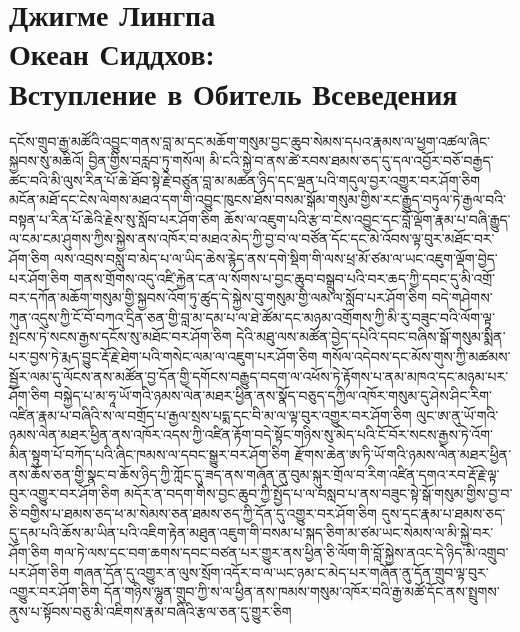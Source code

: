 \normalsize
\section{Джигме Лингпа \\Океан Сиддхов:\\Вступление в Обитель Всеведения}

\ti
དངོས་གྲུབ་རྒྱ་མཚོའི་འབྱུང་གནས་བླ་མ་དང་མཆོག་གསུམ་བྱང་ཆུབ་སེམས་དཔའ་རྣམས་ལ་ཕྱག་འཚལ་ཞིང་སྐྱབས་སུ་མཆིའོ།
བྱིན་གྱིས་བརླབ་ཏུ་གསོལ།
མི་ངའི་སྐྱེ་བ་ནས་ཚེ་རབས་ཐམས་ཅད་དུ་དལ་འབྱོར་བཅོ་བརྒྱད་ཚང་བའི་མི་ལུས་རིན་པོ་ཆེ་ཐོབ་སྟེ་རྗེ་བཙུན་བླ་མ་མཚན་ཉིད་དང་ལྡན་པའི་གདུལ་བྱར་འགྱུར་བར་ཤོག་ཅིག
མངོན་མཐོ་དང་ངེས་ལེགས་མཐའ་དག་གི་འབྱུང་ཁུངས་ཐོས་བསམ་སྒོམ་གསུམ་གྱིས་རང་རྒྱུད་བཏུལ་ཏེ་རྒྱལ་བའི་བསྟན་པ་རིན་པོ་ཆེའི་རྗེས་སུ་སློབ་པར་ཤོག་ཅིག
ཆོས་ལ་འཇུག་པའི་རྩ་བ་ངེས་འབྱུང་དང་བློ་ལྡོག་རྣམ་པ་བཞི་རྒྱུད་ལ་ངམ་ངམ་ཤུགས་ཀྱིས་སྐྱེས་ནས་འཁོར་བ་མཐའ་མེད་ཀྱི་བྱ་བ་ལ་བཙོན་དོང་དང་མེ་འོབས་ལྟ་བུར་མཐོང་བར་ཤོག་ཅིག
ལས་འབྲས་བསླུ་བ་མེད་པ་ལ་ཡིད་ཆེས་རྙེད་ནས་དགེ་སྡིག་གི་ལས་ཕྲ་མོ་ཙམ་ལ་ཡང་འཇུག་ལྡོག་བྱེད་པར་ཤོག་ཅིག
གནས་གྲོགས་འདུ་འཛི་རྐྱེན་ངན་ལ་སོགས་པ་བྱང་ཆུབ་བསྒྲུབ་པའི་བར་ཆད་ཀྱི་དབང་དུ་མི་འགྲོ་བར་དཀོན་མཆོག་གསུམ་གྱི་སྐྱབས་འོག་ཏུ་ཚུད་དེ་སྐྱེས་བུ་གསུམ་གྱི་ལམ་ལ་སློབ་པར་ཤོག་ཅིག
བདེ་གཤེགས་ཀུན་འདུས་ཀྱི་ངོ་བོ་བཀའ་དྲིན་ཅན་གྱི་བླ་མ་དམ་པ་ལ་ཐེ་ཚོམ་དང་མཉམ་འགྲོགས་ཀྱི་མི་རུ་བཟུང་བའི་ལོག་ལྟ་སྤངས་ཏེ་སངས་རྒྱས་དངོས་སུ་མཐོང་བར་ཤོག་ཅིག
དེའི་མཐུ་ལས་མཚོན་བྱེད་དཔེའི་དབང་བཞིས་སྒོ་གསུམ་སྨིན་པར་བྱས་ཏེ་རྨད་བྱུང་རྡོ་རྗེ་ཐེག་པའི་གསེང་ལམ་ལ་འཇུག་པར་ཤོག་ཅིག
གསོལ་འདེབས་དང་མོས་གུས་ཀྱི་མཚམས་སྦྱོར་ལམ་དུ་ལོངས་ནས་མཚོན་བྱ་དོན་གྱི་དགོངས་བརྒྱུད་བདག་ལ་འཕོས་ཏེ་རྟོགས་པ་ནམ་མཁའ་དང་མཉམ་པར་ཤོག་ཅིག
བསྐྱེད་པ་མ་ཧཱ་ཡོ་གའི་ཉམས་ལེན་མཐར་ཕྱིན་ནས་སྣོད་བཅུད་དཀྱིལ་འཁོར་གསུམ་དུ་ཤེས་ཤིང་རིག་འཛིན་རྣམ་པ་བཞིའི་ས་ལ་བགྲོད་པ་རྒྱལ་སྲས་པདྨ་དང་བི་མ་ལ་ལྟ་བུར་འགྱུར་བར་ཤོག་ཅིག
ལུང་ཨ་ནུ་ཡོ་གའི་ཉམས་ལེན་མཐར་ཕྱིན་ནས་འཁོར་འདས་ཀྱི་འཛིན་རྟོག་བདེ་སྟོང་གཉིས་སུ་མེད་པའི་ངོ་བོར་སངས་རྒྱས་ཏེ་འོག་མིན་སྟུག་པོ་བཀོད་པའི་ཞིང་ཁམས་ལ་དབང་སྒྱུར་བར་ཤོག་ཅིག
རྫོགས་ཆེན་ཨ་ཏི་ཡོ་གའི་ཉམས་ལེན་མཐར་ཕྱིན་ནས་ཆོས་ཅན་གྱི་སྣང་བ་ཆོས་ཉིད་ཀྱི་ཀློང་དུ་ཟད་ནས་གཞོན་ནུ་བུམ་སྐུར་གྲོལ་བ་རིག་འཛིན་དགའ་རབ་རྡོ་རྗེ་ལྟ་བུར་འགྱུར་བར་ཤོག་ཅིག
མདོར་ན་བདག་གིས་བྱང་ཆུབ་ཀྱི་སྤྱོད་པ་ལ་བསླབ་པ་ནས་བཟུང་སྟེ་སྒོ་གསུམ་གྱིས་བྱ་བ་ཅི་བགྱིས་པ་ཐམས་ཅད་ཕ་མ་སེམས་ཅན་ཐམས་ཅད་ཀྱི་དོན་དུ་འགྱུར་བར་ཤོག་ཅིག
དུས་དང་རྣམ་པ་ཐམས་ཅད་དུ་དམ་པའི་ཆོས་མ་ཡིན་པའི་འཇིག་རྟེན་མཐུན་འཇུག་གི་བསམ་པ་སྐད་ཅིག་མ་ཙམ་ཡང་སེམས་ལ་མི་སྐྱེ་བར་ཤོག་ཅིག
གལ་ཏེ་ལས་དང་བག་ཆགས་དབང་བཙན་པར་གྱུར་ནས་ཕྱིན་ཅི་ལོག་གི་བློ་སྐྱེས་ནའང་དེ་ཉིད་མི་འགྲུབ་པར་ཤོག་ཅིག
གཞན་དོན་དུ་འགྱུར་ན་ལུས་སྲོག་འདོར་བ་ལ་ཡང་ཉམ་ང་མེད་པར་གཞོན་ནུ་དོན་གྲུབ་ལྟ་བུར་འགྱུར་བར་ཤོག་ཅིག
དོན་གཉིས་ལྷུན་གྲུབ་ཀྱི་ས་ལ་ཕྱིན་ནས་ཁམས་གསུམ་འཁོར་བའི་རྒྱ་མཚོ་དོང་ནས་སྤྲུགས་ནུས་པ་སྟོབས་བཅུ་མི་འཇིགས་རྣམ་བཞིའི་རྩལ་ཅན་དུ་གྱུར་ཅིག
